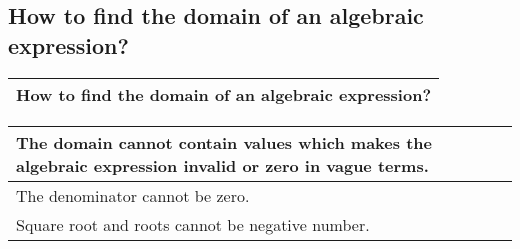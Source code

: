 \subsection{How to find the domain of an algebraic expression?}

\begin{small}
    \begin{tabularx}{1\textwidth}{
            p{}
        }
        \toprule
        How to find the domain of an algebraic expression?
        \\
        \bottomrule
    \end{tabularx}
\end{small}
\begin{small}
    \begin{tabularx}{1\textwidth}{
            p{}
        }
        \toprule
        The domain cannot contain values which makes the algebraic expression
        invalid or zero in vague terms.
        \\
        \midrule
        The denominator cannot be zero.
        \\
        \midrule

        Square root and roots cannot be negative number.
        \\
        \bottomrule
    \end{tabularx}
\end{small}
